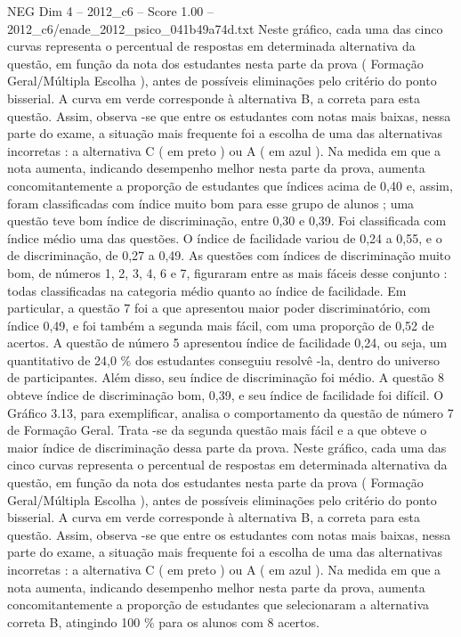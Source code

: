 \begin{textsample}{NEG Dim 4 – 2012\_c6 – Score 1.00 – 2012\_c6/enade\_2012\_psico\_041b49a74d.txt}
Neste gráfico, cada uma das cinco curvas representa o percentual de respostas em determinada alternativa da questão, em função da nota dos estudantes nesta parte da prova ( Formação Geral/Múltipla Escolha ), antes de possíveis eliminações pelo critério do ponto bisserial.
A curva em verde corresponde à alternativa B, a correta para esta questão.
Assim, observa -se que entre os estudantes com notas mais baixas, nessa parte do exame, a situação mais frequente foi a escolha de uma das alternativas incorretas : a alternativa C ( em preto ) ou A ( em azul ).
Na medida em que a nota aumenta, indicando desempenho melhor nesta parte da prova, aumenta concomitantemente a proporção de estudantes que índices acima de 0,40 e, assim, foram classificadas com índice muito bom para esse grupo de alunos ; uma questão teve bom índice de discriminação, entre 0,30 e 0,39.
Foi classificada com índice médio uma das questões.
O índice de facilidade variou de 0,24 a 0,55, e o de discriminação, de 0,27 a 0,49.
As questões com índices de discriminação muito bom, de números 1, 2, 3, 4, 6 e 7, figuraram entre as mais fáceis desse conjunto : todas classificadas na categoria médio quanto ao índice de facilidade.
Em particular, a questão 7 foi a que apresentou maior poder discriminatório, com índice 0,49, e foi também a segunda mais fácil, com uma proporção de 0,52 de acertos.
A questão de número 5 apresentou índice de facilidade 0,24, ou seja, um quantitativo de 24,0 \% dos estudantes conseguiu resolvê -la, dentro do universo de participantes.
Além disso, seu índice de discriminação foi médio.
A questão 8 obteve índice de discriminação bom, 0,39, e seu índice de facilidade foi difícil.
O Gráfico 3.13, para exemplificar, analisa o comportamento da questão de número 7 de Formação Geral.
Trata -se da segunda questão mais fácil e a que obteve o maior índice de discriminação dessa parte da prova.
Neste gráfico, cada uma das cinco curvas representa o percentual de respostas em determinada alternativa da questão, em função da nota dos estudantes nesta parte da prova ( Formação Geral/Múltipla Escolha ), antes de possíveis eliminações pelo critério do ponto bisserial.
A curva em verde corresponde à alternativa B, a correta para esta questão.
Assim, observa -se que entre os estudantes com notas mais baixas, nessa parte do exame, a situação mais frequente foi a escolha de uma das alternativas incorretas : a alternativa C ( em preto ) ou A ( em azul ).
Na medida em que a nota aumenta, indicando desempenho melhor nesta parte da prova, aumenta concomitantemente a proporção de estudantes que selecionaram a alternativa correta B, atingindo 100 \% para os alunos com 8 acertos.

\end{textsample}
